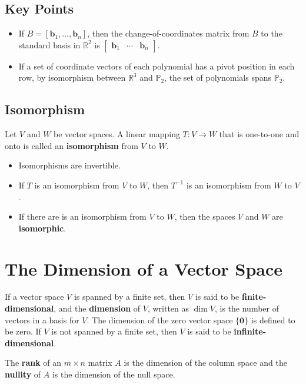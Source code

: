 \documentclass{article}
\begin{document}
\subsection*{Key Points}
\begin{itemize}
    \item If $B=\left[ \mathbf{b}_1, \ldots, \mathbf{b}_n\right]$, then the change-of-coordinates
    matrix from $B$ to the standard basis in $\mathbb{R}^2$ is
    $\begin{bmatrix} \mathbf{b}_1 & \cdots & \mathbf{b}_n\end{bmatrix}$.
    \item If a set of coordinate vectors of each polynomial has a pivot position in each row, by
    isomorphism between $\mathbb{R}^3$ and $\mathbb{P}_2$, the set of polynomials spans
    $\mathbb{P}_2$. 
\end{itemize}

\subsection*{Isomorphism}
Let $V$ and $W$ be vector spaces. A linear mapping $T: V\rightarrow W$ that is one-to-one and onto
is called an \textbf{isomorphism} from $V$ to $W$.
\begin{itemize}
    \item Isomorphisms are invertible.
    \item If $T$ is an isomorphism from $V$ to $W$, then $T^{-1}$ is an isomorphism from $W$ to
    $V$.
    \item If there are is an isomorphism from $V$ to $W$, then the spaces $V$ and $W$ are
    \textbf{isomorphic}.
\end{itemize}
\section*{The Dimension of a Vector Space}
If a vector space $V$ is spanned by a finite set, then $V$ is said to be
\textbf{finite-dimensional}, and the \textbf{dimension} of $V$, written as $\dim V$, is the
number of vectors in a basis for $V$. The dimension of the zero vector space $\{\mathbf{0}\}$ is
defined to be zero. If $V$ is not spanned by a finite set, then $V$ is said to be
\textbf{infinite-dimensional}.

\vspace{1em}

The \textbf{rank} of an $m\times n$ matrix $A$ is the dimension of the column space and the
\textbf{nullity} of $A$ is the dimension of the null space.
\end{document}
